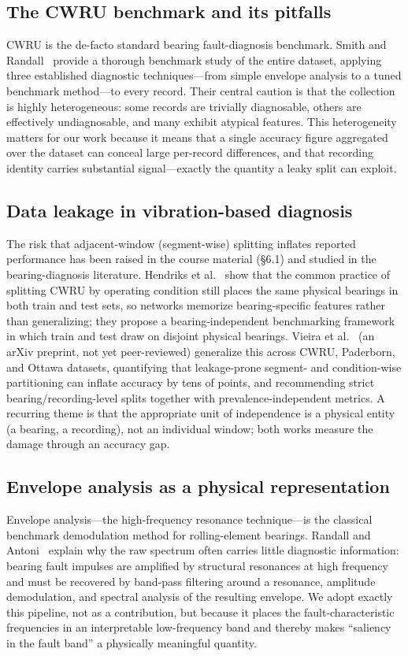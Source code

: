 \documentclass[11pt]{article}
\begin{document}
\subsection{The CWRU benchmark and its pitfalls}
CWRU is the de-facto standard bearing fault-diagnosis benchmark. Smith and
Randall~\cite{smith2015cwru} provide a thorough benchmark study of the entire dataset,
applying three established diagnostic techniques---from simple envelope analysis to a
tuned benchmark method---to every record. Their central caution is that the collection is
highly heterogeneous: some records are trivially diagnosable, others are effectively
undiagnosable, and many exhibit atypical features. This heterogeneity matters for our work
because it means that a single accuracy figure aggregated over the dataset can conceal
large per-record differences, and that recording identity carries substantial
signal---exactly the quantity a leaky split can exploit.

\subsection{Data leakage in vibration-based diagnosis}
The risk that adjacent-window (segment-wise) splitting inflates reported performance has
been raised in the course material (\S6.1) and studied in the bearing-diagnosis
literature. Hendriks et al.~\cite{hendriks2022benchmarking} show that the common practice
of splitting CWRU by operating condition still places the same physical bearings in both
train and test sets, so networks memorize bearing-specific features rather than
generalizing; they propose a bearing-independent benchmarking framework in which train and
test draw on disjoint physical bearings. Vieira et al.~\cite{leakage2025bearing} (an
arXiv preprint, not yet peer-reviewed) generalize this across CWRU, Paderborn, and Ottawa
datasets, quantifying that
leakage-prone segment- and condition-wise partitioning can inflate accuracy by tens of
points, and recommending strict bearing/recording-level splits together with
prevalence-independent metrics. A recurring theme is that the appropriate unit of
independence is a physical entity (a bearing, a recording), not an individual window; both
works measure the damage through an accuracy gap.

\subsection{Envelope analysis as a physical representation}
Envelope analysis---the high-frequency resonance technique---is the classical benchmark
demodulation method for rolling-element bearings. Randall and Antoni~\cite{randall2011tutorial}
explain why the raw spectrum often carries little diagnostic information: bearing fault
impulses are amplified by structural resonances at high frequency and must be recovered by
band-pass filtering around a resonance, amplitude demodulation, and spectral analysis of
the resulting envelope. We adopt exactly this pipeline, not as a contribution, but because
it places the fault-characteristic frequencies in an interpretable low-frequency band and
thereby makes ``saliency in the fault band'' a physically meaningful quantity.
\end{document}
